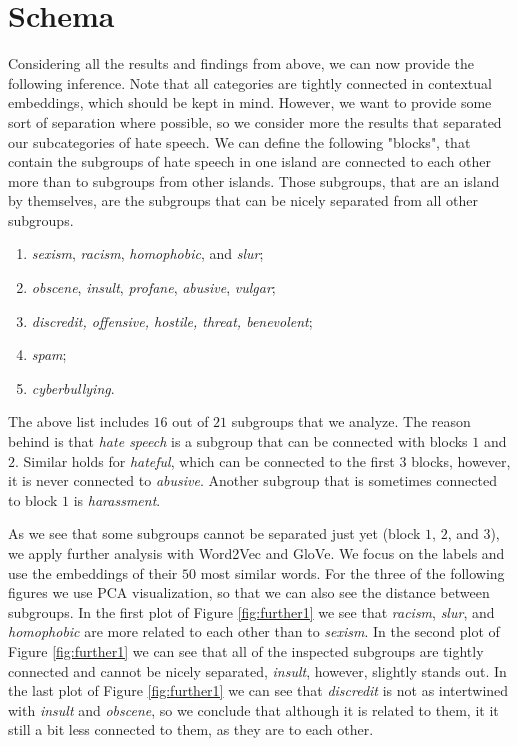 \documentclass[fleqn,moreauthors,10pt]{ds_report}
\begin{document}
\section{Schema}
\label{sec:schema}
Considering all the results and findings from above, we can now provide the following inference. Note that all categories are tightly connected in contextual embeddings, which should be kept in mind. However, we want to provide some sort of separation where possible, so we consider more the results that separated our subcategories of hate speech. We can define the following "blocks", that contain the subgroups of hate speech in one island are connected to each other more than to subgroups from other islands. Those subgroups, that are an island by themselves, are the subgroups that can be nicely separated from all other subgroups. 

\begin{enumerate}
  \item \textit{sexism}, \textit{racism}, \textit{homophobic}, and \textit{slur};
\vspace{-10pt} 
  \item \textit{obscene}, \textit{insult}, \textit{profane}, \textit{abusive}, \textit{vulgar};
\vspace{-10pt}
  \item \textit{discredit, offensive, hostile, threat, benevolent};
\vspace{-10pt}
  \item \textit{spam};
\vspace{-10pt}
  \item \textit{cyberbullying}.
\end{enumerate}

The above list includes $16$ out of $21$ subgroups that we analyze. The reason behind is that \textit{hate speech} is a subgroup that can be connected with blocks $1$ and $2$. Similar holds for \textit{hateful}, which can be connected to the first $3$ blocks, however, it is never connected to \textit{abusive}. Another subgroup that is sometimes connected to block $1$ is \textit{harassment}. 

As we see that some subgroups cannot be separated just yet (block $1$, $2$, and $3$), we apply further analysis with Word2Vec and GloVe. We focus on the labels and use the embeddings of their $50$ most similar words. For the three of the following figures we use PCA visualization, so that we can also see the distance between subgroups. In the first plot of Figure \ref{fig:further1} we see that \textit{racism}, \textit{slur}, and \textit{homophobic} are more related to each other than to \textit{sexism}. In the second plot of Figure \ref{fig:further1} we can see that all of the inspected subgroups are tightly connected and cannot be nicely separated, \textit{insult}, however, slightly stands out. In the last plot of Figure \ref{fig:further1} we can see that \textit{discredit} is not as intertwined with \textit{insult} and \textit{obscene}, so we conclude that although it is related to them, it it still a bit less connected to them, as they are to each other.
\end{document}

